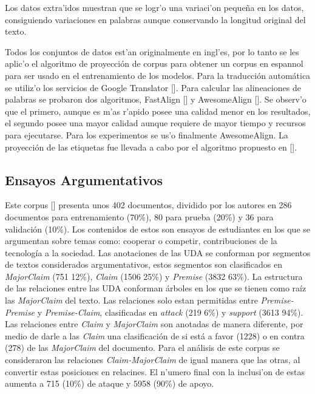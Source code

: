 Los datos extra'idos muestran que se logr'o una variaci'on pequeña en los datos, consiguiendo variaciones en palabras aunque conservando la 
longitud original del texto.

Todos los conjuntos de datos est'an originalmente en ingl'es, por lo tanto se les aplic'o el algoritmo de proyección
de corpus para obtener un corpus en espannol para ser usado en el entrenamiento de los modelos. 
Para la traducción automática se utiliz'o los servicios de Google Translator [\cite{translateGoogle}]. Para calcular las 
alineaciones de palabras se probaron dos algoritmos, FastAlign [\cite{dyer2013fastalign}] y AwesomeAlign 
[\cite{dou2021word}]. Se observ'o que el primero, aunque es m'as r'apido posee una calidad menor en los resultados,
el segundo posee una mayor calidad aunque requiere de mayor tiempo y recursos para ejecutarse. Para los experimentos
se us'o finalmente AwesomeAlign. La proyección de las etiquetas fue llevada a cabo por el algoritmo propuesto 
en [\cite{eger2018cross}].

\subsection{Ensayos Argumentativos}\label{corpus:persuasive_essays}

Este corpus [\cite{stab2017parsing}] presenta unos 402 documentos, dividido por los autores en 286 documentos para entrenamiento (70\%), 
80 para prueba (20\%) y 36 para validación (10\%). Los contenidos de estos son ensayos de estudiantes en los que 
se argumentan sobre temas como: cooperar o competir, contribuciones de la tecnología a la sociedad.
Las anotaciones de las UDA se conforman por segmentos de textos considerados argumentativos, estos segmentos son 
clasificados en \emph{MajorClaim} (751 12\%), \emph{Claim} (1506 25\%) y \emph{Premise} (3832 63\%).
La estructura de las relaciones entre las UDA conforman árboles en los que se tienen como raíz las 
\emph{MajorClaim} del texto. Las relaciones solo estan permitidas entre \emph{Premise-Premise} y \emph{Premise-Claim}, clasificadas
en \emph{attack} (219 6\%) y \emph{support} (3613 94\%). Las relaciones entre \emph{Claim} y \emph{MajorClaim} son anotadas de manera diferente, por medio de 
darle a las \emph{Claim} una clasificación de si está a favor (1228) o en contra (278) de las \emph{MajorClaim} del documento.
Para el análisis de este corpus se consideraron las relaciones \emph{Claim-MajorClaim} de igual manera que las otras,
al convertir estas posiciones en relacines. El n'umero final con la inclusi'on de estas aumenta a 715 (10\%) de ataque y 
5958 (90\%) de apoyo.

